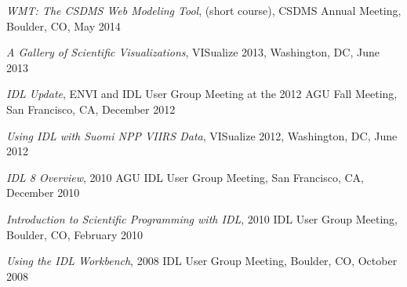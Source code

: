 \begin{enumerate}[{[}1{]}]
  \item \textit{WMT: The CSDMS Web Modeling Tool}, (short course), CSDMS
    Annual Meeting, Boulder, CO, May 2014

  \item \textit{A Gallery of Scientific Visualizations}, {VISualize} 2013,
    Washington, DC, June 2013

  \item \textit{IDL Update}, ENVI and IDL User Group Meeting at the 2012
    AGU Fall Meeting, San Francisco, CA, December 2012

  \item \textit{Using IDL with Suomi NPP VIIRS Data}, {VISualize} 2012,
    Washington, DC, June 2012

  \item \textit{IDL 8 Overview}, 2010 AGU IDL User Group Meeting, San
    Francisco, CA, December 2010

  \item \textit{Introduction to Scientific Programming with IDL}, 2010 IDL
    User Group Meeting, Boulder, CO, February 2010

  \item \textit{Using the IDL Workbench}, 2008 IDL User Group Meeting,
    Boulder, CO, October 2008

\end{enumerate}
